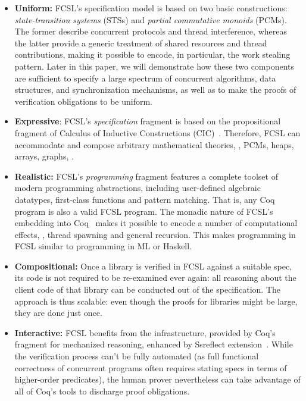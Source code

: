 \begin{itemize}[leftmargin=*]

\item \textbf{Uniform:} FCSL's specification model is based on two
  basic constructions: \emph{state-transition systems} (STSs) and
  \emph{partial commutative monoids} (PCMs). The former describe
  concurrent protocols and thread interference, whereas the latter
  provide a generic treatment of shared resources and thread
  contributions, making it possible to encode, in particular, the work
  stealing pattern. Later in this paper, we will demonstrate how these
  two components are sufficient to specify a large spectrum of
  concurrent algorithms, data structures, and synchronization
  mechanisms, as well as to make the proofs of verification
  obligations to be uniform.

\item \textbf{Expressive}: FCSL's \emph{specification} fragment is
  based on the propositional fragment of Calculus of Inductive
  Constructions (CIC)~\cite{Bertot-Casteran:BOOK}. Therefore, FCSL can
  accommodate and compose arbitrary mathematical theories, \eg, PCMs,
  heaps, arrays, graphs, \etc.
%

\item \textbf{Realistic:} FCSL's \emph{programming} fragment features
  a complete toolset of modern programming abstractions, including
  user-defined algebraic datatypes, first-class functions and pattern
  matching. That is, any Coq program is also a valid FCSL program.
  The monadic nature of FCSL's embedding into
  Coq~\cite{Nanevski-al:ICFP06} makes it possible to encode a number
  of computational effects, \eg, thread spawning and general
  recursion. This makes programming in FCSL similar to programming in
  ML or Haskell.

\item \textbf{Compositional:} Once a library is verified in FCSL
  against a suitable spec, its code is not required to be re-examined
  ever again: all reasoning about the client code of that library can
  be conducted out of the specification. 
  The approach is thus scalable: even though the proofs for
  libraries might be large, they are done just once.

\item \textbf{Interactive:} FCSL benefits from the infrastructure,
  provided by Coq's fragment for mechanized reasoning, enhanced by
  Ssreflect extension~\cite{Gonthier-al:TR}.
% 
%
%
  While the verification process can't be fully automated (as full
  functional correctness of concurrent programs often requires stating
  specs in terms of higher-order predicates), the human prover
  nevertheless can take advantage of all of Coq's tools to discharge
  proof obligations.


\end{itemize}
